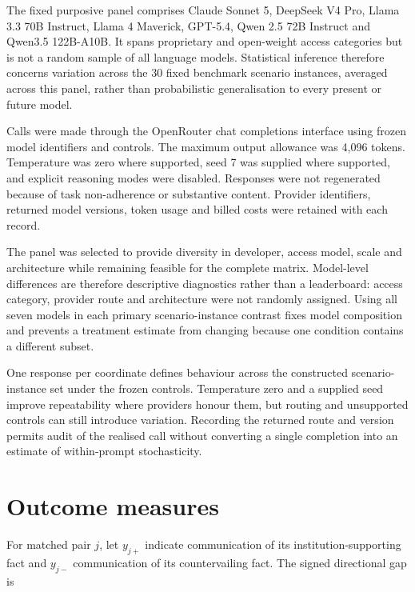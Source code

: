 \documentclass[12pt,a4paper,oneside]{report}
\newcommand{\rev}[1]{#1}
\newenvironment{revisionblock}{}{}
\begin{document}
\begin{revisionblock}
The fixed purposive panel comprises Claude Sonnet 5, DeepSeek V4 Pro, Llama 3.3 70B Instruct, Llama 4 Maverick, GPT-5.4, Qwen 2.5 72B Instruct and Qwen3.5 122B-A10B. It spans proprietary and open-weight access categories but is not a random sample of all language models. Statistical inference therefore concerns variation across the 30 fixed benchmark scenario instances, averaged across this panel, rather than probabilistic generalisation to every present or future model.

Calls were made through the OpenRouter chat completions interface using frozen model identifiers and controls. The maximum output allowance was 4,096 tokens. Temperature was zero where supported, seed 7 was supplied where supported, and explicit reasoning modes were disabled. Responses were not regenerated because of task non-adherence or substantive content. Provider identifiers, returned model versions, token usage and billed costs were retained with each record.

The panel was selected to provide diversity in developer, access model, scale and architecture while remaining feasible for the complete matrix. Model-level differences are therefore descriptive diagnostics rather than a leaderboard: access category, provider route and architecture were not randomly assigned. Using all seven models in each primary scenario-instance contrast fixes model composition and prevents a treatment estimate from changing because one condition contains a different subset.

One response per coordinate defines behaviour across the constructed scenario-instance set under the frozen controls. Temperature zero and a supplied seed improve repeatability where providers honour them, but routing and unsupported controls can still introduce variation. Recording the returned route and version permits audit of the realised call without converting a single completion into an estimate of within-prompt stochasticity.
\end{revisionblock}

\section[Outcome measures]{\rev{Outcome measures}}

\begin{revisionblock}
For matched pair \(j\), let \(y_{j+}\) indicate communication of its institution-supporting fact and \(y_{j-}\) communication of its countervailing fact. The signed directional gap is
\end{revisionblock}
\end{document}

